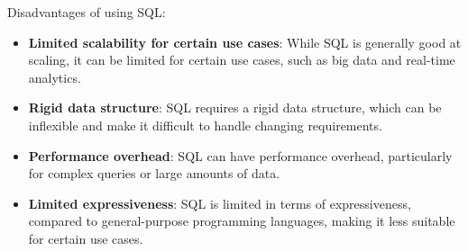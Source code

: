 Disadvantages of using SQL:
\begin{itemize}
    \item \textbf{Limited scalability for certain use cases}: While SQL is generally good at scaling, it can be limited for certain use cases, such as big data and real-time analytics.

    \item \textbf{Rigid data structure}: SQL requires a rigid data structure, which can be inflexible and make it difficult to handle changing requirements.

    \item \textbf{Performance overhead}: SQL can have performance overhead, particularly for complex queries or large amounts of data.

    \item \textbf{Limited expressiveness}: SQL is limited in terms of expressiveness, compared to general-purpose programming languages, making it less suitable for certain use cases.
\end{itemize}





